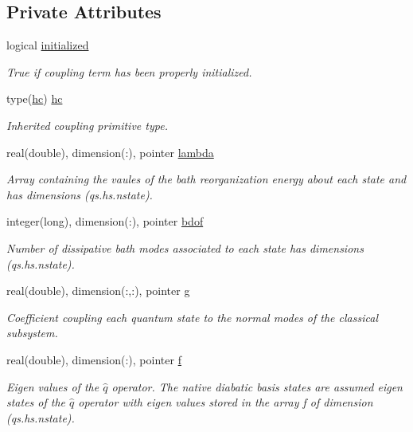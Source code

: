 \subsection*{Private Attributes}
\begin{DoxyCompactItemize}
\item 
logical \hyperlink{structbilinear__class_1_1bilinear_a97bca767cbc1ecae9489db5950da06bc}{initialized}
\begin{DoxyCompactList}\small\item\em True if coupling term has been properly initialized. \end{DoxyCompactList}\item 
type(\hyperlink{structhc__class_1_1hc}{hc}) \hyperlink{structbilinear__class_1_1bilinear_aeb9f98e320b690f4bfef83caf407dfaa}{hc}
\begin{DoxyCompactList}\small\item\em Inherited coupling primitive type. \end{DoxyCompactList}\item 
real(double), dimension(\+:), pointer \hyperlink{structbilinear__class_1_1bilinear_aabd615d49d52220aac52707b2e2b1aa6}{lambda}
\begin{DoxyCompactList}\small\item\em Array containing the vaules of the bath reorganization energy about each state and has dimensions (qs.\+hs.\+nstate). \end{DoxyCompactList}\item 
integer(long), dimension(\+:), pointer \hyperlink{structbilinear__class_1_1bilinear_a78e65d82cd358d5dfa19b780ab877fa0}{bdof}
\begin{DoxyCompactList}\small\item\em Number of dissipative bath modes associated to each state has dimensions (qs.\+hs.\+nstate). \end{DoxyCompactList}\item 
real(double), dimension(\+:,\+:), pointer \hyperlink{structbilinear__class_1_1bilinear_a910401429e7649dba49acbab872a1b75}{g}
\begin{DoxyCompactList}\small\item\em Coefficient coupling each quantum state to the normal modes of the classical subsystem. \end{DoxyCompactList}\item 
real(double), dimension(\+:), pointer \hyperlink{structbilinear__class_1_1bilinear_a809699845e36e344b7aeb51642c333ec}{f}
\begin{DoxyCompactList}\small\item\em Eigen values of the $ \hat q $ operator. The native diabatic basis states are assumed eigen states of the $ \hat q $ operator with eigen values stored in the array f of dimension (qs.\+hs.\+nstate). \end{DoxyCompactList}\item 

\end{DoxyCompactItemize}
